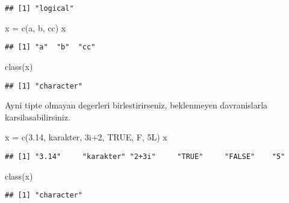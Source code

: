 \documentclass[
]{book}
\newenvironment{Shaded}{\begin{snugshade}}{\end{snugshade}}
\newcommand{\ConstantTok}[1]{\textcolor[rgb]{0.00,0.00,0.00}{#1}}
\newcommand{\DecValTok}[1]{\textcolor[rgb]{0.00,0.00,0.81}{#1}}
\newcommand{\FloatTok}[1]{\textcolor[rgb]{0.00,0.00,0.81}{#1}}
\newcommand{\FunctionTok}[1]{\textcolor[rgb]{0.00,0.00,0.00}{#1}}
\newcommand{\NormalTok}[1]{#1}
\newcommand{\OtherTok}[1]{\textcolor[rgb]{0.56,0.35,0.01}{#1}}
\newcommand{\SpecialCharTok}[1]{\textcolor[rgb]{0.00,0.00,0.00}{#1}}
\newcommand{\StringTok}[1]{\textcolor[rgb]{0.31,0.60,0.02}{#1}}
\begin{document}
\begin{verbatim}
## [1] "logical"
\end{verbatim}

\begin{Shaded}
\begin{Highlighting}[]
\NormalTok{x }\OtherTok{=} \FunctionTok{c}\NormalTok{(}\StringTok{\textquotesingle{}a\textquotesingle{}}\NormalTok{, }\StringTok{\textquotesingle{}b\textquotesingle{}}\NormalTok{, }\StringTok{\textquotesingle{}cc\textquotesingle{}}\NormalTok{)}
\NormalTok{x}
\end{Highlighting}
\end{Shaded}

\begin{verbatim}
## [1] "a"  "b"  "cc"
\end{verbatim}

\begin{Shaded}
\begin{Highlighting}[]
\FunctionTok{class}\NormalTok{(x)}
\end{Highlighting}
\end{Shaded}

\begin{verbatim}
## [1] "character"
\end{verbatim}

Ayni tipte olmayan degerleri birlestirirseniz, beklenmeyen davranislarla karsilasabilirsiniz.

\begin{Shaded}
\begin{Highlighting}[]
\NormalTok{x }\OtherTok{=} \FunctionTok{c}\NormalTok{(}\FloatTok{3.14}\NormalTok{, }\StringTok{\textquotesingle{}karakter\textquotesingle{}}\NormalTok{, 3i}\SpecialCharTok{+}\DecValTok{2}\NormalTok{, }\ConstantTok{TRUE}\NormalTok{, F, 5L)}
\NormalTok{x}
\end{Highlighting}
\end{Shaded}

\begin{verbatim}
## [1] "3.14"     "karakter" "2+3i"     "TRUE"     "FALSE"    "5"
\end{verbatim}

\begin{Shaded}
\begin{Highlighting}[]
\FunctionTok{class}\NormalTok{(x)}
\end{Highlighting}
\end{Shaded}

\begin{verbatim}
## [1] "character"
\end{verbatim}
\end{document}
